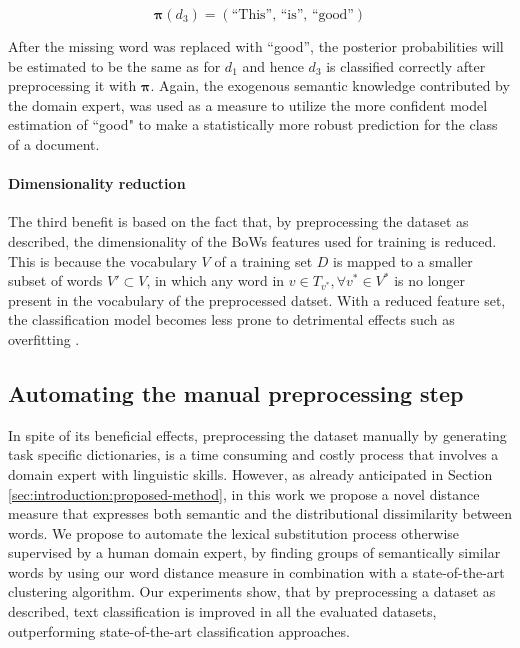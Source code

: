 \begin{equation*}
\boldsymbol\pi(d_3) = (\text{``This'', ``is'', ``good''})
\end{equation*}

After the missing word was replaced with ``good'', the posterior probabilities
will be estimated to be the same as for $d_1$ and
hence $d_3$ is classified correctly after preprocessing it with
$\boldsymbol\pi$.
Again, the exogenous semantic knowledge contributed by the domain expert, was
used as a measure to utilize the more confident model estimation of ``good" to
make a statistically more robust prediction for the class of a document.

\paragraph{Dimensionality reduction} The third benefit is based on the fact
that, by preprocessing the dataset as described, the dimensionality of the BoWs
features used for training is reduced. This is because the vocabulary $V$ of a
training set $D$ is mapped to a smaller subset of words $V' \subset V$, in which
any word in $v \in T_{v^*}, \forall v^* \in V^*$ is no longer present in the vocabulary 
of the preprocessed datset. With a reduced feature set, the classification model becomes 
less prone to detrimental effects such as overfitting \cite{sebastiani2002machine}.   

\subsection{Automating the manual preprocessing step}

In spite of its beneficial effects, preprocessing the dataset manually by
generating task specific dictionaries, is a time consuming and costly process
that involves a domain expert with linguistic skills.
However, as already anticipated in Section \ref{sec:introduction:proposed-method}, in this work
we propose a novel distance measure that expresses both semantic and
the distributional dissimilarity between words. We propose to automate the lexical substitution process otherwise supervised by a human domain expert,
by finding groups of semantically similar words by using our word distance measure in combination 
with a state-of-the-art clustering algorithm.  Our experiments show, that by preprocessing a dataset as described, 
text classification is improved in all the evaluated datasets, outperforming state-of-the-art classification approaches. 
